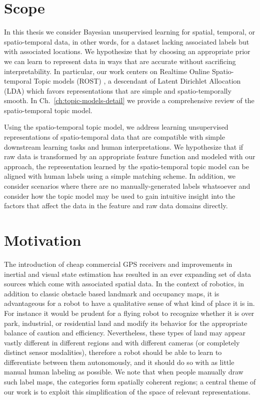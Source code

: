 \section{Scope} \label{sec:intro-scope}
In this thesis we consider Bayesian unsupervised learning for spatial, temporal, or spatio-temporal data, in other words, for a dataset lacking associated labels but with associated locations. We hypothesize that by choosing an appropriate prior we can learn to represent data in ways that are accurate without sacrificing interpretability. In particular, our work centers on Realtime Online Spatio-temporal Topic models (ROST) \citep{Girdhar2014}, a descendant of Latent Dirichlet Allocation (LDA) \citep{Blei2003} which favors representations that are simple and spatio-temporally smooth. In Ch.~\ref{ch:topic-models-detail} we provide a comprehensive review of the spatio-temporal topic model.

Using the spatio-temporal topic model, we address learning unsupervised representations of spatio-temporal data that are compatible with simple downstream learning tasks and human interpretations. We hypothesize that if raw data is transformed by an appropriate feature function and modeled with our approach, the representation learned by the spatio-temporal topic model can be aligned with human labels using a simple matching scheme. In addition, we consider scenarios where there are no manually-generated labels whatsoever and consider how the topic model may be used to gain intuitive insight into the factors that affect the data in the feature and raw data domains directly.

\section{Motivation} \label{sec:intro-motivation}
The introduction of cheap commercial GPS receivers and improvements in inertial and visual state estimation has resulted in an ever expanding set of data sources which come with associated spatial data. In the context of robotics, in addition to classic obstacle based landmark and occupancy maps, it is advantageous for a robot to have a qualitative sense of what kind of place it is in. For instance it would be prudent for a flying robot to recognize whether it is over park, industrial, or residential land and modify its behavior for the appropriate balance of caution and efficiency. Nevertheless, these types of land may appear vastly different in different regions and with different cameras (or completely distinct sensor modalities), therefore a robot should be able to learn to differentiate between them autonomously, and it should do so with as little manual human labeling as possible. We note that when people manually draw such label maps, the categories form spatially coherent regions; a central theme of our work is to exploit this simplification of the space of relevant representations.

